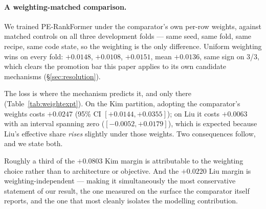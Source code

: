 \documentclass[11pt]{article}
\begin{document}
\paragraph{A weighting-matched comparison.} We trained PE-RankFormer under the
comparator's own per-row weights, against matched controls on all three development
folds --- same seed, same fold, same recipe, same code state, so the weighting is the
only difference. Uniform weighting wins on every fold: $+0.0148$, $+0.0108$, $+0.0151$,
mean $\mathbf{+0.0136}$, same sign on 3/3, which clears the promotion bar this paper
applies to its own candidate mechanisms (\S\ref{sec:resolution}).

The loss is where the mechanism predicts it, and only there
(Table~\ref{tab:weightexpt}). On the Kim partition, adopting the comparator's weights
costs $+0.0247$ (95\% CI $[+0.0144,+0.0355]$); on Liu it costs $+0.0063$ with an interval
spanning zero ($[-0.0052,+0.0179]$), which is expected because Liu's effective share
\emph{rises} slightly under those weights. Two consequences follow, and we state both.

Roughly a third of the $+0.0803$ Kim margin is attributable to the weighting choice
rather than to architecture or objective. And the $+0.0220$ Liu margin is
weighting-independent --- making it simultaneously the most conservative statement of
our result, the one measured on the surface the comparator itself reports, and the one
that most cleanly isolates the modelling contribution.
\end{document}
